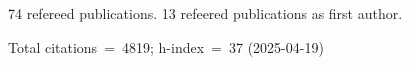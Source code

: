 74 refereed publications. 13 refeered publications as first author.

Total citations~=~4819; h-index~=~37 (2025-04-19)